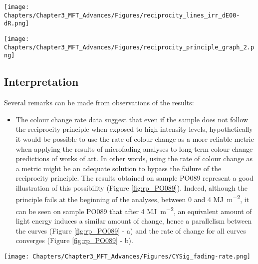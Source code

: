 \begin{figure*}[!h]
\centering
\texttt{[image: Chapters/Chapter3\_MFT\_Advances/Figures/reciprocity\_lines\_irr\_dE00-dR.png]}
\caption[\hspace{0.3cm}Reciprocity lines]{Reciprocity lines for all samples using (a) \dEOO and (b) \dRvis.}
\label{fig:rp_lines}
\end{figure*}


\begin{figure*}[!h]
\centering
\texttt{[image: Chapters/Chapter3\_MFT\_Advances/Figures/reciprocity\_principle\_graph\_2.png]}
\caption[\hspace{0.3cm}Assessing the validity of the reciprocity principle.]{Graphical representation to assess the validity of the reciprocity principle.}
\label{fig:rp_graph-representation}
\end{figure*}





\newpage
\subsection{Interpretation}

Several remarks can be made from observations of the results:
\begin{itemize}
    \item The colour change rate data suggest that even if the sample does not follow the reciprocity principle when exposed to high intensity levels, hypothetically it would be possible to use the rate of colour change as a more reliable metric when applying the results of microfading analyses to long-term colour change predictions of works of art. In other words, using the rate of colour change as a metric might be an adequate solution to bypass the failure of the reciprocity principle. The results obtained on sample PO089 represent a good illustration of this possibility (Figure \ref{fig:rp_PO089}). Indeed, although the principle fails at the beginning of the analyses, \ie between 0 and 4 \unit{\mega\joule\per\square\metre}, it can be seen on sample PO089 that after 4 \unit{\mega\joule\per\square\metre}, an equivalent amount of light energy induces a similar amount of change, hence a parallelism between the curves (Figure \ref{fig:rp_PO089} - a) and the rate of change for all curves converges (Figure \ref{fig:rp_PO089} - b). 
\end{itemize}

\begin{figure*}[!h]
\centering
\texttt{[image: Chapters/Chapter3\_MFT\_Advances/Figures/CYSig\_fading-rate.png]}
\caption[\hspace{0.3cm}Results of the reciprocity failure experiments on sample PO089]{Results of the reciprocity failure experiments on sample PO089: (a) \dEOO curves and (b) colour change rate.}
\label{fig:rp_PO089}
\end{figure*}


